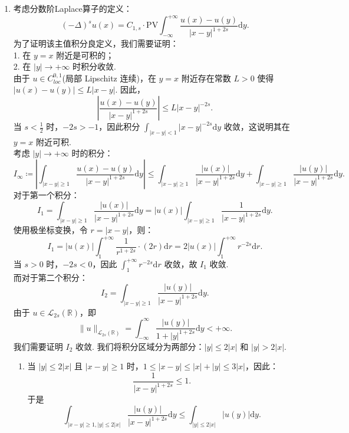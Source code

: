 \begin{solution}
    \begin{enumerate}
        \item[1.]考虑分数阶Laplace算子的定义：
        \[
        (-\Delta)^s u(x) = C_{1,s} \cdot \mathrm{PV} \int_{-\infty}^{+\infty} \frac{u(x) - u(y)}{|x-y|^{1+2s}} \mathrm{d}y.
        \]
        为了证明该主值积分良定义，我们需要证明：\\
        1. 在 $y = x$ 附近是可积的；\\
        2. 在 $|y| \to +\infty$ 时积分收敛.\\
        由于 $u \in C_{loc}^{0,1}$(局部 Lipschitz 连续)，在 $y = x$ 附近存在常数 $L > 0$ 使得 $|u(x) - u(y)| \leq L |x-y|$. 因此，
        \[
        \left| \frac{u(x) - u(y)}{|x-y|^{1+2s}} \right| \leq L |x-y|^{-2s}.
        \]
        当 $\displaystyle s < \frac{1}{2}$ 时，$\displaystyle -2s > -1$，因此积分 $\displaystyle\int_{|x-y|<1} |x-y|^{-2s} \mathrm{d}y$ 收敛，这说明其在 $y = x$ 附近可积.\\
        考虑 $|y| \to +\infty$ 时的积分：
        \[
        I_{\infty} \coloneqq \left| \int_{|x-y|\geq 1} \frac{u(x) - u(y)}{|x-y|^{1+2s}} \mathrm{d}y \right| \leq \int_{|x-y|\geq 1} \frac{|u(x)|}{|x-y|^{1+2s}} \mathrm{d}y + \int_{|x-y|\geq 1} \frac{|u(y)|}{|x-y|^{1+2s}} \mathrm{d}y.
        \]
        对于第一个积分：
        \[
        I_1 = \int_{|x-y|\geq 1} \frac{|u(x)|}{|x-y|^{1+2s}} \mathrm{d}y = |u(x)| \int_{|x-y|\geq 1} \frac{1}{|x-y|^{1+2s}} \mathrm{d}y.
        \]
        使用极坐标变换，令 $r = |x-y|$，则：
        \[
        I_1 = |u(x)| \int_{1}^{+\infty} \frac{1}{r^{1+2s}} \cdot (2r) \mathrm{d}r = 2|u(x)| \int_{1}^{+\infty} r^{-2s} \mathrm{d}r.
        \]
        当 $s > 0$ 时，$-2s < 0$，因此 $\displaystyle\int_{1}^{+\infty} r^{-2s} \mathrm{d}r$ 收敛，故 $I_1$ 收敛.\\
        而对于第二个积分：
        \[
        I_2 = \int_{|x-y|\geq 1} \frac{|u(y)|}{|x-y|^{1+2s}} \mathrm{d}y.
        \]
        由于 $u \in \mathcal{L}_{2s}(\mathbb{R})$，即
        \[
        \|u\|_{\mathcal{L}_{2s}(\mathbb{R})} = \int_{-\infty}^{\infty} \frac{|u(y)|}{1 + |y|^{1+2s}} \mathrm{d}y <+\infty.
        \]
        我们需要证明 $I_2$ 收敛. 我们将积分区域分为两部分：$|y| \leq 2|x|$ 和 $|y| > 2|x|$.\\
        \begin{enumerate}
        \item[i.]当 $|y| \leq 2|x|$ 且 $|x-y| \geq 1$ 时，$1\leq|x-y| \leq |x| + |y| \leq 3|x|$，因此：
        \[
        \frac{1}{|x-y|^{1+2s}} \leq 1.
        \]
        于是
        \[
        \int_{|x-y|\geq 1, |y| \leq 2|x|} \frac{|u(y)|}{|x-y|^{1+2s}} \mathrm{d}y \leq \int_{|y| \leq 2|x|} |u(y)| \mathrm{d}y.
        \]


\end{enumerate}
\end{enumerate}
\end{solution}
